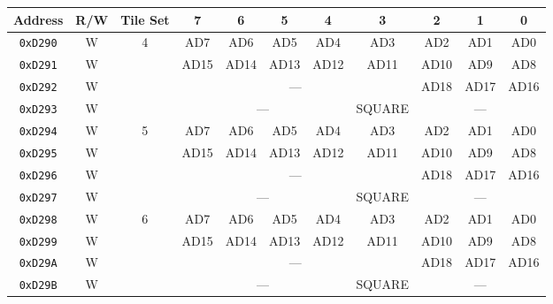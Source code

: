 \begin{table}[ht]
    \begin{center}
        \begin{tabular}{|c|c|c|c|c|c|c|c|c|c|c|} \hline
            Address & R/W & Tile Set & 7 & 6 & 5 & 4 & 3 & 2 & 1 & 0 \\ \hline\hline
            \verb+0xD290+ & W & \multirow{4}{*}{4} & AD7 & AD6 & AD5 & AD4 & AD3 & AD2 & AD1 & AD0 \\ \cline{1-2}\cline{4-11}
            \verb+0xD291+ & W &                    & AD15 & AD14 & AD13 & AD12 & AD11 & AD10 & AD9 & AD8 \\ \cline{1-2}\cline{4-11}
            \verb+0xD292+ & W &                    & \multicolumn{5}{|c|}{---} & AD18 & AD17 & AD16 \\ \cline{1-2}\cline{4-11}
            \verb+0xD293+ & W &                    & \multicolumn{4}{|c|}{---} & SQUARE & \multicolumn{3}{|c|}{---} \\ \hline\hline

            \verb+0xD294+ & W & \multirow{4}{*}{5} & AD7 & AD6 & AD5 & AD4 & AD3 & AD2 & AD1 & AD0 \\ \cline{1-2}\cline{4-11}
            \verb+0xD295+ & W &                    & AD15 & AD14 & AD13 & AD12 & AD11 & AD10 & AD9 & AD8 \\ \cline{1-2}\cline{4-11}
            \verb+0xD296+ & W &                    & \multicolumn{5}{|c|}{---} & AD18 & AD17 & AD16 \\ \cline{1-2}\cline{4-11}
            \verb+0xD297+ & W &                    & \multicolumn{4}{|c|}{---} & SQUARE & \multicolumn{3}{|c|}{---} \\ \hline\hline

            \verb+0xD298+ & W & \multirow{4}{*}{6} & AD7 & AD6 & AD5 & AD4 & AD3 & AD2 & AD1 & AD0 \\ \cline{1-2}\cline{4-11}
            \verb+0xD299+ & W &                    & AD15 & AD14 & AD13 & AD12 & AD11 & AD10 & AD9 & AD8 \\ \cline{1-2}\cline{4-11}
            \verb+0xD29A+ & W &                    & \multicolumn{5}{|c|}{---} & AD18 & AD17 & AD16 \\ \cline{1-2}\cline{4-11}
            \verb+0xD29B+ & W &                    & \multicolumn{4}{|c|}{---} & SQUARE & \multicolumn{3}{|c|}{---} \\ \hline\hline


\end{tabular}
\end{center}
\end{table}
